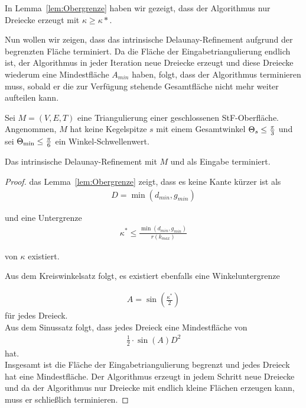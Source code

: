 In Lemma~\ref{lem:Obergrenze} haben wir gezeigt, dass der Algorithmus nur Dreiecke erzeugt mit $\kappa \geq \kappa* $.

Nun wollen wir zeigen, dass das intrinsische Delaunay-Refinement aufgrund der begrenzten Fläche terminiert. Da die Fläche der Eingabetriangulierung endlich ist, der Algorithmus in jeder Iteration neue Dreiecke erzeugt und diese Dreiecke wiederum eine Mindestfläche $A_{min}$ haben, folgt, dass der Algorithmus terminieren muss, sobald er die zur Verfügung stehende Gesamtfläche nicht mehr weiter aufteilen kann.\\  



\begin{theorem}
Sei $M = (V,E,T)$ eine Triangulierung einer geschlossenen StF-Oberfläche.
Angenommen, $M$ hat keine Kegelspitze $s$ mit einem Gesamtwinkel $\gesamtwinkel*[s] \leq \frac{\pi}{3}$ und sei  $\kleinsterWinkel* \leq \frac{\pi}{6}$ ein Winkel-Schwellenwert. 


Das intrinsische Delaunay-Refinement mit $M$ und \kleinsterWinkel als Eingabe terminiert.
\end{theorem}



\begin{proof}
das Lemma~\ref{lem:Obergrenze} zeigt, dass es keine Kante kürzer ist als  \begin{align*}
    D = \min(d_{min},g_{min})
\end{align*}

und eine Untergrenze \begin{align*}
    \kappa^* \leq \frac{\min(d_{min},g_{min})}{r(k_{max})}
\end{align*}

von $\kappa$ existiert.

Aus dem Kreiswinkelsatz folgt, es existiert ebenfalls eine Winkeluntergrenze 

\begin{align*}
    A = \sin(\frac{\kappa^*}{2})
\end{align*}
für jedes Dreieck.\\
Aus dem Sinussatz folgt, dass jedes Dreieck eine Mindestfläche von \begin{align*}
    \frac{1}{2} \cdot \sin(A)D^2 
\end{align*}
hat.\\

Insgesamt ist die Fläche der Eingabetriangulierung begrenzt und jedes Dreieck hat eine Mindestfläche. Der Algorithmus erzeugt in jedem Schritt neue Dreiecke und da der Algorithmus nur Dreiecke mit endlich kleine Flächen erzeugen kann, muss er schließlich terminieren.
\end{proof}








